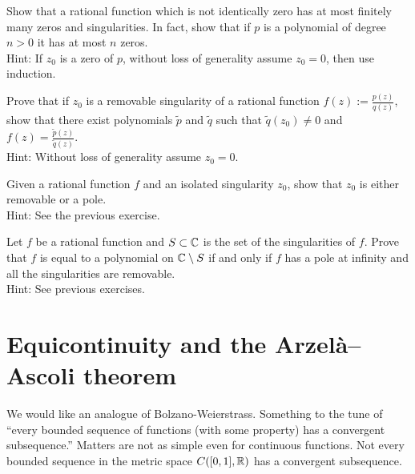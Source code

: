 \begin{exercise}
Show that a rational function which is not identically
zero has at most finitely many zeros and
singularities.  In fact, show that if $p$ is a polynomial of 
degree $n > 0$ it has at most $n$ zeros.
\\
Hint: If $z_0$ is a zero of $p$, without loss of generality assume $z_0 =
0$, then use induction.
\end{exercise}

\begin{exercise}
Prove that if $z_0$ is a removable singularity of a rational
function $f(z) := \frac{p(z)}{q(z)}$, show that there exist
polynomials $\widetilde{p}$ and $\widetilde{q}$ such that
$\widetilde{q}(z_0) \not= 0$ and $f(z) =
\frac{\widetilde{p}(z)}{\widetilde{q}(z)}$.
\\
Hint: Without loss of generality assume $z_0 = 0$.
\end{exercise}

\begin{exercise}
Given a rational function $f$ and an isolated singularity $z_0$,
show that $z_0$ is either removable or a pole.
\\
Hint: See the previous exercise.
\end{exercise}

\begin{exercise}
Let $f$ be a rational function and $S \subset {\mathbb{C}}$ is the 
set of the singularities of $f$.
Prove that $f$ is equal to a polynomial on ${\mathbb{C}} \setminus S$
if and only if
$f$ has a pole at infinity and all the singularities are removable.
\\
Hint: See previous exercises.
\end{exercise}




\sectionnewpage
\section{Equicontinuity and the Arzel{\`a}--Ascoli theorem}
\label{sec:arzelaascoli}



We would like an analogue of Bolzano-Weierstrass.  Something to the tune of
``every bounded
sequence of functions (with some property) has a convergent subsequence.''
Matters are not
as simple even for continuous functions. 
Not every bounded sequence in the metric space $C([0,1],{\mathbb{R}})$ has
a convergent subsequence.

